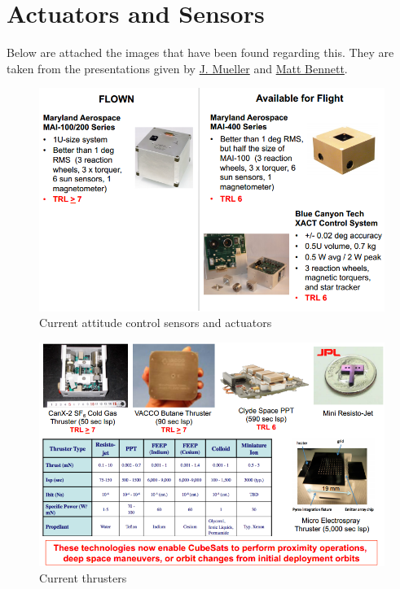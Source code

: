 \section{Actuators and Sensors}

Below are attached the images that have been found regarding this. They are taken from the presentations given by \href{http://kiss.caltech.edu/workshops/smallsat2012b/presentations/mueller.pdf}{J.	Mueller} and \href{http://kiss.caltech.edu/workshops/smallsat2012b/presentations/bennett.pdf}{Matt Bennett}. 

\begin{center}
\begin{figure}[!ht]
\includegraphics[scale=0.8]{attitude_control.png}
\caption{Current attitude control sensors and actuators}
\end{figure}
\newpage
\begin{figure}[!ht]
\includegraphics[scale=0.7]{prop_available.png}
\caption{Current thrusters}
\end{figure}
\end{center}
\newpage

